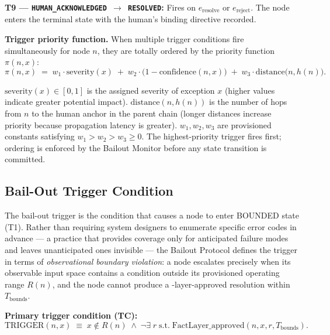 \bigskip
\noindent\textbf{T9 --- \texttt{HUMAN\_ACKNOWLEDGED $\rightarrow$ RESOLVED}:} Fires on $e_{\text{resolve}}$ or $e_{\text{reject}}$. The node enters the terminal state with the human's binding directive recorded.

\bigskip
\textbf{Trigger priority function.} When multiple trigger conditions fire simultaneously for node $n$, they are totally ordered by the priority function $\pi(n, x)$:
\begin{equation}
\pi(n, x) \;=\; w_1 \cdot \text{severity}(x) \;+\; w_2 \cdot \bigl(1 - \text{confidence}(n, x)\bigr) \;+\; w_3 \cdot \text{distance}\bigl(n, h(n)\bigr). \tag{PF}
\end{equation}

$\text{severity}(x) \in [0, 1]$ is the assigned severity of exception $x$ (higher values indicate greater potential impact). $\text{distance}(n, h(n))$ is the number of hops from $n$ to the human anchor in the parent chain (longer distances increase priority because propagation latency is greater). $w_1, w_2, w_3$ are provisioned constants satisfying $w_1 > w_2 > w_3 \geq 0$. The highest-priority trigger fires first; ordering is enforced by the Bailout Monitor before any state transition is committed.

\subsection{Bail-Out Trigger Condition}\label{sec:bailout-trigger}

The bail-out trigger is the condition that causes a node to enter BOUNDED state (T1). Rather than requiring system designers to enumerate specific error codes in advance --- a practice that provides coverage only for anticipated failure modes and leaves unanticipated ones invisible --- the Bailout Protocol defines the trigger in terms of \emph{observational boundary violation}: a node escalates precisely when its observable input space contains a condition outside its provisioned operating range $R(n)$, and the node cannot produce a \fact-layer-approved resolution within $T_{\text{bounds}}$.

\bigskip
\noindent\textbf{Primary trigger condition (TC):}
\begin{equation}
\text{TRIGGER}(n, x) \;\equiv\; x \notin R(n) \;\land\; \neg\exists\; r \;\text{s.t.}\; \text{FactLayer\_approved}(n, x, r, T_{\text{bounds}}). \tag{TC-primary}
\end{equation}

